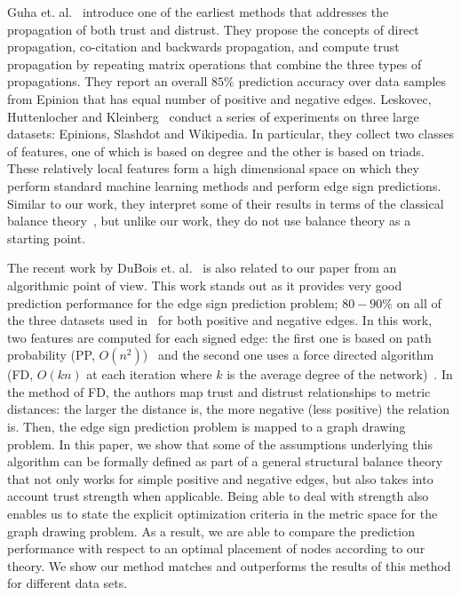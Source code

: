 Guha et. al.~\cite{Guha:04} introduce one of the earliest methods that
addresses the propagation of both trust and distrust. They propose the
concepts of direct propagation, co-citation and backwards propagation,
and compute trust propagation by repeating matrix operations that
combine the three types of propagations. They report an overall $85\%$
prediction accuracy over data samples from Epinion that has equal
number of positive and negative edges.  Leskovec, Huttenlocher and
Kleinberg~\cite{Leskovec:2010} conduct a series of experiments on
three large datasets: Epinions, Slashdot and Wikipedia. In particular,
they collect two classes of features, one of which is based on degree
and the other is based on triads. These relatively local features form
a high dimensional space on which they perform standard machine
learning methods and perform edge sign predictions. Similar to our
work, they interpret some of their results in terms of the classical
balance theory~\cite{Cartwright:56}, but unlike our work, they do not
use balance theory as a starting point.

The recent work by DuBois et. al.~\cite{golbeck:distrust2011} is also
related to our paper from an algorithmic point of view. This work
stands out as it provides very good prediction performance for the
edge sign prediction problem; $80-90 \%$ on all of the three datasets
used in~\cite{Leskovec:2010} for both positive and negative edges. In this work, two
features are computed for each signed edge: the first one is based on path
probability (PP, $O(n^2)$)~\cite{DuBois:2009} and the second one uses
a force directed algorithm (FD, $O(kn)$ at each iteration where $k$ is
the average degree of the network)~\cite{golbeck:distrust2011}. In
the method of FD, the authors map trust and distrust relationships to metric
distances: the larger the distance is, the more negative (less
positive) the relation is. Then, the edge sign prediction problem is
mapped to a graph drawing problem. In this paper, we show that some of the assumptions underlying this
algorithm can be formally defined as part of a general structural
balance theory that not only works for simple positive and negative
edges, but also takes into account trust strength when
applicable. Being able to deal with strength also enables us to state
the explicit optimization criteria in the metric space for the graph
drawing problem. As a result, we are able to compare the prediction
performance with respect to an optimal placement of nodes according to
our theory. We show our method matches and outperforms the results of
this method for different data sets.

